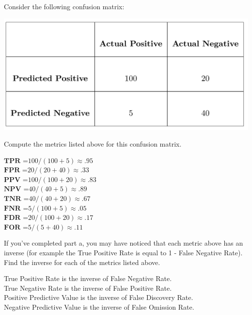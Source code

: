 \documentclass[assignment02_Solutions]{subfiles}
\begin{document}
\begin{exercise}
Consider the following confusion matrix:
\begin{center}
\includegraphics[width=0.5\linewidth]{figures/confusionNumbers}
\end{center}

\bes
\item Compute the metrics listed above for this confusion matrix. \\

\begin{boxedsolution}
$\textbf{TPR =} 100 / (100 + 5) \approx .95$\\
$\textbf{FPR =} 20  / (20 + 40) \approx .33$\\
$\textbf{PPV =} 100 / (100 + 20) \approx .83$\\
$\textbf{NPV =} 40 / (40 + 5) \approx .89$\\
$\textbf{TNR =} 40 / (40 + 20) \approx .67$\\
$\textbf{FNR =} 5 / (100 + 5) \approx .05$\\
$\textbf{FDR =} 20 / (100 + 20) \approx .17$\\
$\textbf{FOR =} 5 / (5 + 40) \approx .11$\\
\end{boxedsolution}

\item If you've completed part a, you may have noticed that each metric above has an inverse (for example the True Positive Rate is equal to 1 - False Negative Rate). Find the inverse for each of the metrics listed above.


\begin{boxedsolution}
True Positive Rate is the inverse of False Negative Rate.\\
True Negative Rate is the inverse of False Positive Rate.\\
Positive Predictive Value is the inverse of False Discovery Rate.\\
Negative Predictive Value is the inverse of False Omission Rate.\\
\end{boxedsolution}



\end{exercise}
\end{document}
